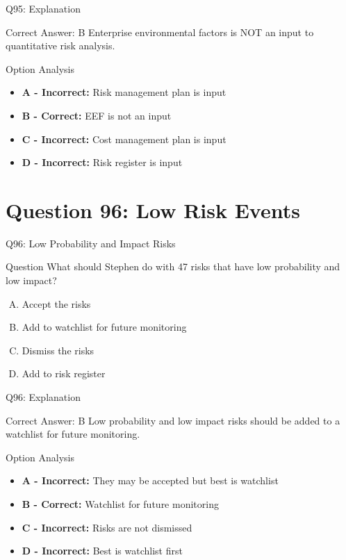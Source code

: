 \documentclass{beamer}
\begin{document}
	\begin{frame}{Q95: Explanation}
		\begin{block}{Correct Answer: B}
			Enterprise environmental factors is NOT an input to quantitative risk analysis.
		\end{block}
		\begin{block}{Option Analysis}
			\begin{itemize}
				\item \textbf{A - Incorrect:} Risk management plan is input
				\item \textbf{B - Correct:} EEF is not an input
				\item \textbf{C - Incorrect:} Cost management plan is input
				\item \textbf{D - Incorrect:} Risk register is input
			\end{itemize}
		\end{block}
	\end{frame}
	
	\section{Question 96: Low Risk Events}
	
	\begin{frame}{Q96: Low Probability and Impact Risks}
		\begin{block}{Question}
			What should Stephen do with 47 risks that have low probability and low impact?
		\end{block}
		\begin{enumerate}[(A)]
			\item Accept the risks
			\item Add to watchlist for future monitoring
			\item Dismiss the risks
			\item Add to risk register
		\end{enumerate}
	\end{frame}
	
	\begin{frame}{Q96: Explanation}
		\begin{block}{Correct Answer: B}
			Low probability and low impact risks should be added to a watchlist for future monitoring.
		\end{block}
		\begin{block}{Option Analysis}
			\begin{itemize}
				\item \textbf{A - Incorrect:} They may be accepted but best is watchlist
				\item \textbf{B - Correct:} Watchlist for future monitoring
				\item \textbf{C - Incorrect:} Risks are not dismissed
				\item \textbf{D - Incorrect:} Best is watchlist first
			\end{itemize}
		\end{block}
	\end{frame}
	
\end{document}
